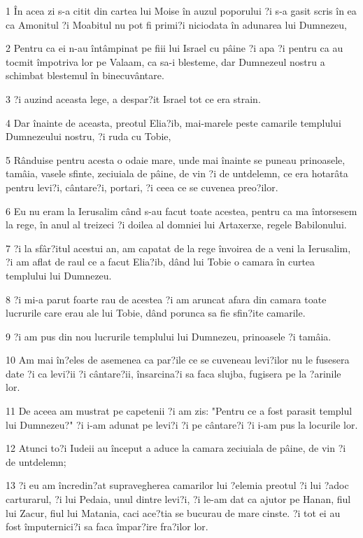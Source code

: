 \par 1 În acea zi s-a citit din cartea lui Moise în auzul poporului ?i s-a gasit scris în ea ca Amonitul ?i Moabitul nu pot fi primi?i niciodata în adunarea lui Dumnezeu,
\par 2 Pentru ca ei n-au întâmpinat pe fiii lui Israel cu pâine ?i apa ?i pentru ca au tocmit împotriva lor pe Valaam, ca sa-i blesteme, dar Dumnezeul nostru a schimbat blestemul în binecuvântare.
\par 3 ?i auzind aceasta lege, a despar?it Israel tot ce era strain.
\par 4 Dar înainte de aceasta, preotul Elia?ib, mai-marele peste camarile templului Dumnezeului nostru, ?i ruda cu Tobie,
\par 5 Rânduise pentru acesta o odaie mare, unde mai înainte se puneau prinoasele, tamâia, vasele sfinte, zeciuiala de pâine, de vin ?i de untdelemn, ce era hotarâta pentru levi?i, cântare?i, portari, ?i ceea ce se cuvenea preo?ilor.
\par 6 Eu nu eram la Ierusalim când s-au facut toate acestea, pentru ca ma întorsesem la rege, în anul al treizeci ?i doilea al domniei lui Artaxerxe, regele Babilonului.
\par 7 ?i la sfâr?itul acestui an, am capatat de la rege învoirea de a veni la Ierusalim, ?i am aflat de raul ce a facut Elia?ib, dând lui Tobie o camara în curtea templului lui Dumnezeu.
\par 8 ?i mi-a parut foarte rau de acestea ?i am aruncat afara din camara toate lucrurile care erau ale lui Tobie, dând porunca sa fie sfin?ite camarile.
\par 9 ?i am pus din nou lucrurile templului lui Dumnezeu, prinoasele ?i tamâia.
\par 10 Am mai în?eles de asemenea ca par?ile ce se cuveneau levi?ilor nu le fusesera date ?i ca levi?ii ?i cântare?ii, însarcina?i sa faca slujba, fugisera pe la ?arinile lor.
\par 11 De aceea am mustrat pe capetenii ?i am zis: "Pentru ce a fost parasit templul lui Dumnezeu?" ?i i-am adunat pe levi?i ?i pe cântare?i ?i i-am pus la locurile lor.
\par 12 Atunci to?i Iudeii au început a aduce la camara zeciuiala de pâine, de vin ?i de untdelemn;
\par 13 ?i eu am încredin?at supravegherea camarilor lui ?elemia preotul ?i lui ?adoc carturarul, ?i lui Pedaia, unul dintre levi?i, ?i le-am dat ca ajutor pe Hanan, fiul lui Zacur, fiul lui Matania, caci ace?tia se bucurau de mare cinste. ?i tot ei au fost împuternici?i sa faca împar?ire fra?ilor lor.
